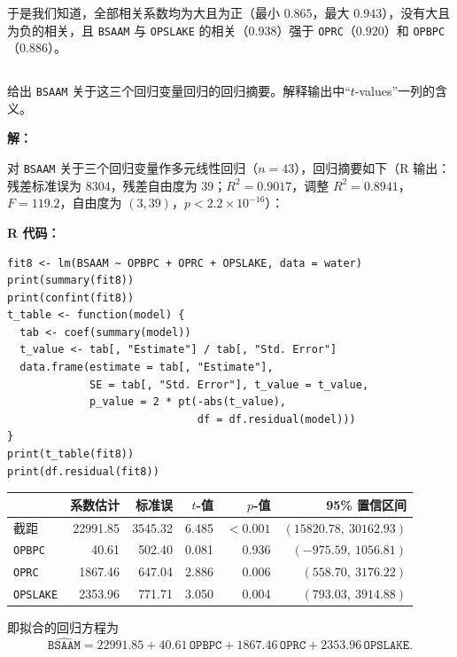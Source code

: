 \documentclass[12pt,a4paper]{article}
\begin{document}
\begin{answerbox}
于是我们知道，全部相关系数均为大且为正（最小 $0.865$，最大 $0.943$），没有大且为负的相关，且 \texttt{BSAAM} 与 \texttt{OPSLAKE} 的相关（$0.938$）强于 \texttt{OPRC}（$0.920$）和 \texttt{OPBPC}（$0.886$）。
\end{answerbox}

\subsection{}

给出 \texttt{BSAAM} 关于这三个回归变量回归的回归摘要。解释输出中“$t$-values”一列的含义。

\begin{answerbox}
\textbf{解：}

对 \texttt{BSAAM} 关于三个回归变量作多元线性回归（$n=43$），回归摘要如下（R 输出：残差标准误为 $8304$，残差自由度为 $39$；$R^2=0.9017$，调整 $R^2=0.8941$，$F=119.2$，自由度为 $(3,39)$，$p<2.2\times10^{-16}$）：

\textbf{R 代码：}
\begin{lstlisting}[style=rcode]
fit8 <- lm(BSAAM ~ OPBPC + OPRC + OPSLAKE, data = water)
print(summary(fit8))
print(confint(fit8))
t_table <- function(model) {
  tab <- coef(summary(model))
  t_value <- tab[, "Estimate"] / tab[, "Std. Error"]
  data.frame(estimate = tab[, "Estimate"],
             SE = tab[, "Std. Error"], t_value = t_value,
             p_value = 2 * pt(-abs(t_value),
                              df = df.residual(model)))
}
print(t_table(fit8))
print(df.residual(fit8))
\end{lstlisting}

\begin{center}
\small
\begin{tabular}{lrrrrr}
\toprule
 & 系数估计 & 标准误 & $t$-值 & $p$-值 & 95\% 置信区间 \\
\midrule
截距            & 22991.85 & 3545.32 & 6.485 & $<0.001$ & $(15820.78,\ 30162.93)$ \\
\texttt{OPBPC}  & 40.61    & 502.40  & 0.081 & 0.936    & $(-975.59,\ 1056.81)$ \\
\texttt{OPRC}   & 1867.46  & 647.04  & 2.886 & 0.006    & $(558.70,\ 3176.22)$ \\
\texttt{OPSLAKE}& 2353.96  & 771.71  & 3.050 & 0.004    & $(793.03,\ 3914.88)$ \\
\bottomrule
\end{tabular}
\end{center}

即拟合的回归方程为
$$
\widehat{\texttt{BSAAM}}=22991.85+40.61\,\texttt{OPBPC}+1867.46\,\texttt{OPRC}+2353.96\,\texttt{OPSLAKE}.
$$


\end{answerbox}
\end{document}
